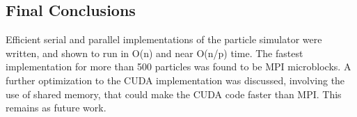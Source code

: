 \documentclass[11pt]{article} %
\begin{document}
\subsection{Final Conclusions}

Efficient serial and parallel implementations of the particle simulator were written, and shown to run in O(n) and near O(n/p) time. The fastest implementation for more than 500 particles was found to be MPI microblocks. A further optimization to the CUDA implementation was discussed, involving the use of shared memory, that could make the CUDA code faster than MPI. This remains as future work.
\end{document}
